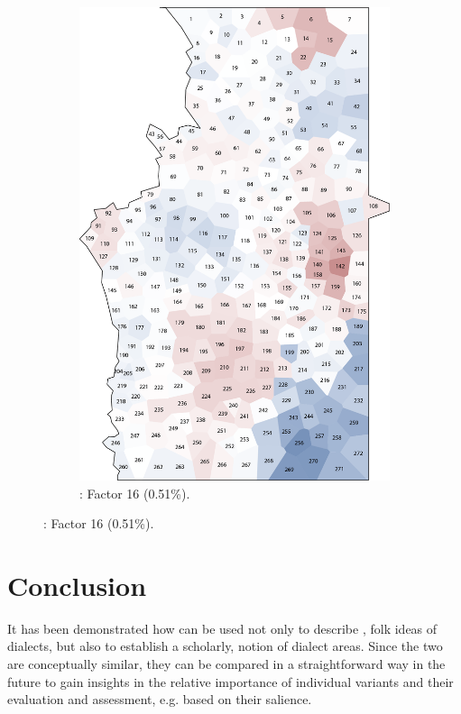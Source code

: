 \documentclass[output=paper]{LSP/langsci}
\begin{document}
\begin{figure}
\begin{subfigure}[t]{0.3\textwidth}
\includegraphics[width=\textwidth]{illustrations/pickl_fig18}
\caption{: Factor 16 (0.51\%).}
\label{fig:pickl:18}
\end{subfigure}
\end{figure}

\section{Conclusion}
It has been demonstrated how  can be used not only to describe , folk ideas of dialects, but also to establish a scholarly,  notion of dialect areas. Since the two are conceptually similar, they can be compared in a straightforward way in the future to gain insights in the relative importance of individual variants and their evaluation and assessment, e.g. based on their salience.
\end{document}
